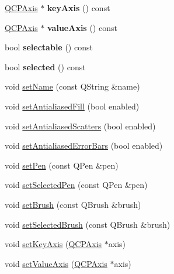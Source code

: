 \begin{DoxyCompactItemize}
\hyperlink{class_q_c_p_axis}{Q\+C\+P\+Axis} $\ast$ {\bfseries key\+Axis} () const
\item 
\hypertarget{class_q_c_p_abstract_plottable_af47809a644a68ffd955fb30b01fb4f2f}{}\label{class_q_c_p_abstract_plottable_af47809a644a68ffd955fb30b01fb4f2f} 
\hyperlink{class_q_c_p_axis}{Q\+C\+P\+Axis} $\ast$ {\bfseries value\+Axis} () const
\item 
\hypertarget{class_q_c_p_abstract_plottable_adf896b8a213fea74440c7bc969cf6e4c}{}\label{class_q_c_p_abstract_plottable_adf896b8a213fea74440c7bc969cf6e4c} 
bool {\bfseries selectable} () const
\item 
\hypertarget{class_q_c_p_abstract_plottable_a0b3b514474fe93354fc74cfc144184b4}{}\label{class_q_c_p_abstract_plottable_a0b3b514474fe93354fc74cfc144184b4} 
bool {\bfseries selected} () const
\item 
void \hyperlink{class_q_c_p_abstract_plottable_ab79c7ba76bc7fa89a4b3580e12149f1f}{set\+Name} (const Q\+String \&name)
\item 
void \hyperlink{class_q_c_p_abstract_plottable_a089d6b5577120239b55c39ed27c39536}{set\+Antialiased\+Fill} (bool enabled)
\item 
void \hyperlink{class_q_c_p_abstract_plottable_a2f03f067ede2ed4da6f7d0e4777a3f02}{set\+Antialiased\+Scatters} (bool enabled)
\item 
void \hyperlink{class_q_c_p_abstract_plottable_a757beb744b96cf1855cca5ab9d3ecf52}{set\+Antialiased\+Error\+Bars} (bool enabled)
\item 
void \hyperlink{class_q_c_p_abstract_plottable_ab74b09ae4c0e7e13142fe4b5bf46cac7}{set\+Pen} (const Q\+Pen \&pen)
\item 
void \hyperlink{class_q_c_p_abstract_plottable_a6911603cad23ab0469b108224517516f}{set\+Selected\+Pen} (const Q\+Pen \&pen)
\item 
void \hyperlink{class_q_c_p_abstract_plottable_a7a4b92144dca6453a1f0f210e27edc74}{set\+Brush} (const Q\+Brush \&brush)
\item 
void \hyperlink{class_q_c_p_abstract_plottable_ae8c816874089f7a44001e8618e81a9dc}{set\+Selected\+Brush} (const Q\+Brush \&brush)
\item 
void \hyperlink{class_q_c_p_abstract_plottable_a8524fa2994c63c0913ebd9bb2ffa3920}{set\+Key\+Axis} (\hyperlink{class_q_c_p_axis}{Q\+C\+P\+Axis} $\ast$axis)
\item 
void \hyperlink{class_q_c_p_abstract_plottable_a71626a07367e241ec62ad2c34baf21cb}{set\+Value\+Axis} (\hyperlink{class_q_c_p_axis}{Q\+C\+P\+Axis} $\ast$axis)
\item 

\end{DoxyCompactItemize}
